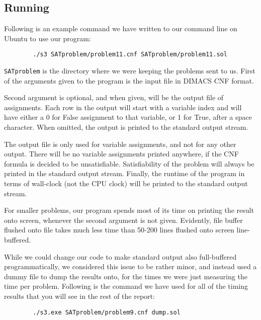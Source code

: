 \documentclass{article}
\begin{document}
\subsection{Running}

Following is an example command we have written to our command
line on Ubuntu to use our program:

\begin{center}
    \begin{verbatim}
        ./s3 SATproblem/problem11.cnf SATproblem/problem11.sol
    \end{verbatim}
\end{center}

\texttt{SATproblem} is the directory where we were keeping the
problems sent to us. First of the arguments given to the program
is the input file in DIMACS CNF format.

Second argument is optional, and when given, will be the output
file of assignments. Each row in the output will start with
a variable index and will have either a 0 for False assignment
to that variable, or 1 for True, after a space character.
When omitted, the output is printed to the standard output stream.

The output file is only used for variable assignments,
and not for any other output. There will be no variable
assignments printed anywhere, if the CNF formula is decided to
be unsatisfiable. Satisfiability of the problem will always
be printed in the standard output stream. Finally, the
runtime of the program in terms of wall-clock (not the CPU clock)
will be printed to the standard output stream.

For smaller problems, our program spends most of its time on
printing the result onto screen, whenever the second argument is
not given. Evidently, file buffer flushed onto file takes much
less time than 50-200 lines flushed onto screen line-buffered.

While we could change our code to make standard output also
full-buffered programmatically, we considered this issue to be
rather minor, and instead used a dummy file to dump the results
onto, for the times we were just measuring the time per problem.
Following is the command we have used for all of the timing
results that you will see in the rest of the report:

\begin{center}
    \begin{verbatim}
        ./s3.exe SATproblem/problem9.cnf dump.sol
    \end{verbatim}
\end{center}
\end{document}
